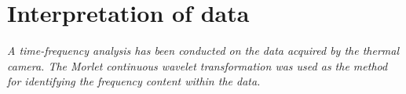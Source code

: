 \chapter{Interpretation of data}
\textit{A time-frequency analysis has been conducted on the data acquired by the thermal camera. The Morlet continuous wavelet transformation was used as the method for identifying the frequency content within the data.}